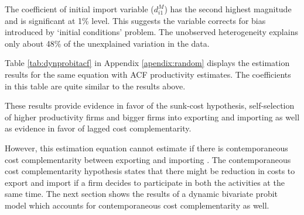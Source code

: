 \documentclass[12pt]{article}
\begin{document}
The coefficient of initial import variable ($d_{i1}^{M}$) has the
second highest magnitude  and is 
  significant at 1\% level. This suggests the variable corrects for
  bias introduced by `initial conditions' problem.    The
  unobserved heterogeneity  explains only about 48\% of the unexplained
  variation in the data.  

Table \ref{tab:dynprobitacf} in Appendix \ref{apendix:random} displays the estimation results for the same
equation with ACF productivity estimates. The coefficients in this
table are quite similar to the results above. 

These results provide evidence in favor of  the sunk-cost hypothesis,
self-selection of higher productivity firms and bigger firms into
exporting and importing as well as evidence in favor of lagged cost
complementarity. 

However, this estimation equation cannot estimate if
there is contemporaneous cost complementarity between exporting
and importing . The contemporaneous cost complementarity hypothesis
states that there might be reduction in costs to export and import if
a firm decides to participate in both the activities at the same time.
The next section shows the results of a dynamic
bivariate probit model which accounts for contemporaneous cost complementarity
as well. 



  
\end{document}
